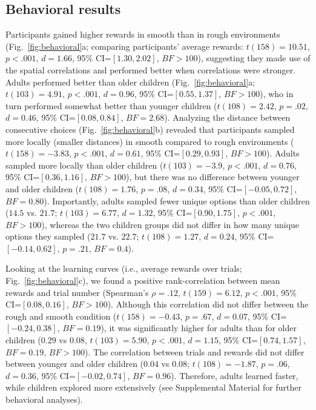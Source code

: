 \documentclass[a4paper,man, floatsintext, natbib]{apa6}
\begin{document}
\subsection{Behavioral results} 
Participants gained higher rewards in smooth than in rough environments (Fig.~\ref{fig:behavioral}a; comparing participants' average rewards: $t(158)=10.51$, $p<.001$, $d=1.66$, 95\% CI=$[1.30,2.02]$, $BF>100$), suggesting they made use of the spatial correlations and performed better when correlations were stronger. Adults performed better than older children (Fig.~\ref{fig:behavioral}a; $t(103)=4.91$, $p<.001$, $d=0.96$, 95\% CI=$[0.55,1.37]$, $BF>100$), who in turn performed somewhat better than younger children ($t(108)=2.42$, $p=.02$, $d=0.46$, 95\% CI=$[0.08,0.84]$, $BF=2.68$). Analyzing the distance between consecutive choices (Fig.~\ref{fig:behavioral}b) revealed that participants sampled more locally (smaller distances) in smooth compared to rough environments ($t(158)=-3.83$, $p<.001$, $d=0.61$, 95\% CI=$[0.29,0.93]$, $BF>100$). Adults sampled more locally than older children ($t(103)=-3.9$, $p<.001$, $d=0.76$, 95\% CI=$[0.36,1.16]$, $BF>100$), but there was no difference between younger and older children ($t(108)=1.76$, $p=.08$, $d=0.34$, 95\% CI=$[-0.05,0.72]$, $BF=0.80$). Importantly, adults sampled fewer unique options than older children ($14.5$ vs. $21.7$; $t(103)=6.77$, $d=1.32$, 95\% CI=$[0.90,1.75]$, $p<.001$, $BF>100$), whereas the two children groups did not differ in how many unique options they sampled ($21.7$ vs. $22.7$; $t(108)=1.27$, $d=0.24$, 95\% CI=$[-0.14,0.62]$, $p=.21$, $BF=0.4$).

Looking at the learning curves (i.e., average rewards over trials; Fig.~\ref{fig:behavioral}c), we found a positive rank-correlation between mean rewards and trial number (Spearman's $\rho=.12$, $t(159)=6.12$, $p<.001$, 95\% CI=$[0.08, 0.16]$, $BF>100$). Although this correlation did not differ between the rough and smooth condition ($t(158)=-0.43$, $p=.67$, $d=0.07$, 95\% CI=$[-0.24, 0.38]$, $BF=0.19$), it was significantly higher for adults than for older children ($0.29$ vs $0.08$, $t(103)=5.90$, $p<.001$, $d=1.15$, 95\% CI=$[0.74, 1.57]$, $BF=0.19$, $BF>100$). The correlation between trials and rewards did not differ between younger and older children ($0.04$ vs $0.08$; $t(108)=-1.87$, $p=.06$, $d=0.36$, 95\% CI=$[-0.02, 0.74]$, $BF=0.96$). Therefore, adults learned faster, while children explored more extensively (see Supplemental Material for further behavioral analyses). 
\end{document}
